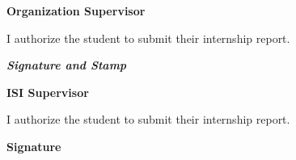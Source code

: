 \newpage
\thispagestyle{empty}

\begin{center}
\textbf{Organization Supervisor}
\end{center}
\begin{tcolorbox}[
colback=white,
colframe=black,
arc=6mm,
boxrule=1.5pt,
width=\textwidth,
]

I authorize the student to submit their internship report.

\vspace{1cm}



\vspace{1cm}

\begin{flushright}
\textit{\textbf{Signature and Stamp}}
\end{flushright}

\vspace{1.5cm}

\end{tcolorbox}

\vspace{1.5cm}


\begin{center}
\textbf{ISI Supervisor}
\end{center}

\begin{tcolorbox}[
colback=white,
colframe=black,
arc=6mm,
boxrule=1.5pt,
width=\textwidth,
]

I authorize the student to submit their internship report.

\vspace{1cm}



\vspace{1cm}

\begin{flushright}
\textbf{Signature}
\end{flushright}

\vspace{1.5cm}

\end{tcolorbox}